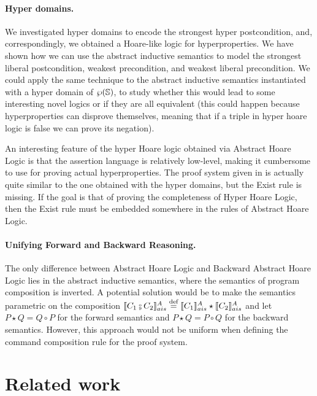 \documentclass[
  10pt,       %
  twoside,    %
  a4paper,    %
  english,    %
  tikz,       %
  openright,  %
]{book}
\begin{document}
\paragraph{\textbf{Hyper domains.}}
We investigated hyper domains to encode the strongest hyper postcondition,  and,
correspondingly, we obtained
a Hoare-like logic for hyperproperties. We have shown how we can use the
abstract inductive semantics to model the strongest liberal postcondition,
weakest precondition, and weakest liberal precondition. We could apply the
same technique to  the abstract inductive semantics instantiated with a hyper
domain of $\wp(\mathbb{S})$, to study whether this would  lead to some interesting novel 
logics or if
they are all equivalent (this could happen because hyperproperties can disprove themselves,
meaning that if a triple in hyper hoare logic is false we can prove its negation).

An interesting feature of the hyper Hoare logic obtained via Abstract Hoare Logic
is that the assertion language is relatively low-level, making it cumbersome to
use for proving actual hyperproperties. The proof system given in \cite{Darnier2023}
is actually quite similar to the one obtained with the hyper domains, but the
Exist rule is missing. If the goal is that of proving the completeness of Hyper
Hoare Logic, then the Exist rule must be embedded somewhere in the rules of Abstract Hoare
Logic.

\paragraph{\textbf{Unifying Forward and Backward Reasoning.}}
The only difference between Abstract Hoare Logic and Backward Abstract Hoare
Logic lies in the abstract inductive semantics, where the semantics of program
composition is inverted. A potential solution would be to make the
semantics parametric on the composition $\asem{C_1 \fcmp C_2} \defeq \asem{C_1}
\star \asem{C_2}$ and let $P \star Q= Q \circ P$ for the forward semantics and
$P \star Q = P \circ Q$ for the backward semantics. However, this approach would not be uniform
when defining the command composition rule for the proof system.

\section{Related work}
\end{document}
